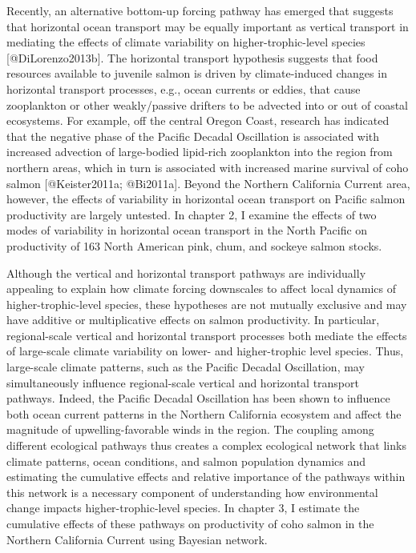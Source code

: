 Recently, an alternative bottom-up forcing pathway has emerged that
suggests that horizontal ocean transport may be equally important as
vertical transport in mediating the effects of climate variability on
higher-trophic-level species {[}@DiLorenzo2013b{]}. The horizontal
transport hypothesis suggests that food resources available to juvenile
salmon is driven by climate-induced changes in horizontal transport
processes, e.g., ocean currents or eddies, that cause zooplankton or
other weakly/passive drifters to be advected into or out of coastal
ecosystems. For example, off the central Oregon Coast, research has
indicated that the negative phase of the Pacific Decadal Oscillation is
associated with increased advection of large-bodied lipid-rich
zooplankton into the region from northern areas, which in turn is
associated with increased marine survival of coho salmon
{[}@Keister2011a; @Bi2011a{]}. Beyond the Northern California Current
area, however, the effects of variability in horizontal ocean transport
on Pacific salmon productivity are largely untested. In chapter 2, I
examine the effects of two modes of variability in horizontal ocean
transport in the North Pacific on productivity of 163 North American
pink, chum, and sockeye salmon stocks.

Although the vertical and horizontal transport pathways are individually
appealing to explain how climate forcing downscales to affect local
dynamics of higher-trophic-level species, these hypotheses are not
mutually exclusive and may have additive or multiplicative effects on
salmon productivity. In particular, regional-scale vertical and
horizontal transport processes both mediate the effects of large-scale
climate variability on lower- and higher-trophic level species. Thus,
large-scale climate patterns, such as the Pacific Decadal Oscillation,
may simultaneously influence regional-scale vertical and horizontal
transport pathways. Indeed, the Pacific Decadal Oscillation has been
shown to influence both ocean current patterns in the Northern
California ecosystem and affect the magnitude of upwelling-favorable
winds in the region. The coupling among different ecological pathways
thus creates a complex ecological network that links climate patterns,
ocean conditions, and salmon population dynamics and estimating the
cumulative effects and relative importance of the pathways within this
network is a necessary component of understanding how environmental
change impacts higher-trophic-level species. In chapter 3, I estimate
the cumulative effects of these pathways on productivity of coho salmon
in the Northern California Current using Bayesian network.

